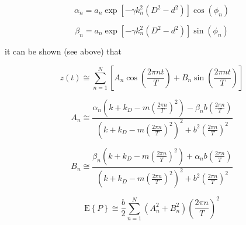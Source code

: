 $$ \alpha_n = a_n\exp[-\gamma k_n^2(D^2 - d^2)]\cos(\phi_n) $$

$$ \beta_n = a_n\exp[-\gamma k_n^2(D^2 - d^2)]\sin(\phi_n) $$

\noindent it can be shown (see above) that

$$ z(t) \cong \sum_{n=1}^{N} \left[A_n\cos\left(\frac{2\pi nt}{T}\right) + B_n\sin\left(\frac{2\pi nt}{T}\right)\right] $$

$$ A_n \cong \frac{\alpha_n\left(k + k_D - m\left(\frac{2\pi n}{T}\right)^2\right) - \beta_n b\left(\frac{2\pi n}{T}\right)}{\left(k + k_D - m\left(\frac{2\pi n}{T}\right)^2\right)^2 + b^2\left(\frac{2\pi n}{T}\right)^2} $$

$$ B_n \cong \frac{\beta_n\left(k + k_D - m\left(\frac{2\pi n}{T}\right)^2\right) + \alpha_n b\left(\frac{2\pi n}{T}\right)}{\left(k + k_D - m\left(\frac{2\pi n}{T}\right)^2\right)^2 + b^2\left(\frac{2\pi n}{T}\right)^2} $$

$$ \textrm{E}\left\{P\right\} \cong \frac{b}{2}\sum_{n=1}^{N}\left(A_n^2 + B_n^2\right)\left(\frac{2\pi n}{T}\right)^2 $$

